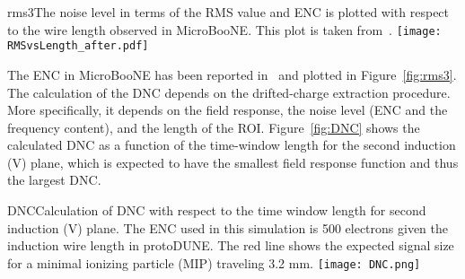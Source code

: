 \begin{cdrfigure}{rms3}{The noise level in terms of the RMS value and ENC 
is plotted with respect to the wire length observed in MicroBooNE. 
This plot is taken from~\cite{noise_filter}.}
\texttt{[image: RMSvsLength\_after.pdf]}
\end{cdrfigure}

The ENC in MicroBooNE has been reported in~\cite{noise_filter} and plotted 
in Figure~\ref{fig:rms3}. The calculation of the DNC depends on the 
drifted-charge extraction procedure. More specifically, it depends on the field 
response, the noise level (ENC and the frequency content), and the length of the ROI. 
Figure~\ref{fig:DNC} shows the calculated DNC as a function of the time-window length 
for the second induction (V) plane, which is expected to have the smallest field 
response function  and thus the largest DNC. 

\begin{cdrfigure}{DNC}{Calculation of DNC with respect to the time window length for second induction (V) plane. 
The ENC used in this simulation is 500 electrons given the induction wire length in protoDUNE. 
The red line shows the expected signal size for a minimal ionizing particle (MIP) 
traveling 3.2 mm.}
\texttt{[image: DNC.png]}
\end{cdrfigure}


